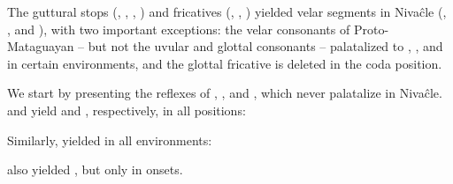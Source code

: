 The guttural stops (, , , ) and fricatives (, , ) yielded velar segments in Nivaĉle (, , and ), with two important exceptions: the velar consonants of Proto-Mataguayan -- but not the uvular and glottal consonants -- palatalized to , , and  in certain environments, and the glottal fricative  is deleted in the coda position.

We start by presenting the reflexes of , , and , which never palatalize in Nivaĉle.  and  yield  and , respectively, in all positions:

\sloppy
\begin{exe}
    \ex \food
    \ex \elbow
    \ex \welln
    \ex \snore
    \ex \inorderto
    \ex \alienable
    \ex \distrust
    \ex \leg
    \ex \dwarf
    \ex \starn
    \ex \costume
    \ex \soul
    \ex \wildcat
    \ex \tsaqaq
    \ex \paralytic
    \ex \wildhoney
    \ex \knee
\end{exe}

Similarly,  yielded  in all environments:

\begin{exe}
    \ex \fatv
    \ex \najendup
    \ex \centipede
    \ex \crab
    \ex \north
    \ex \suncho
    \ex \killbird
    \ex \finger
    \ex \ocelot
    \ex \takeaway
    \ex \redquebracho
    \ex \runv
    \ex \barnowl
    \ex \oldn
    \ex \manysg
    \ex \quick
    \ex \jabiru
    \ex \deep
    \ex \longv
    \ex \siyaj
    \ex \anteater
    \ex \thunder
    \ex \pseudo
    \ex \shoot
    \ex \far
    \ex \burnvi
    \ex \fullriver
    \ex \tsofatajf
    \ex \tired
    \ex \largefat
    \ex \paloflojof
    \ex \piranhamn
    \ex \blackalgarrobof
    \ex \rhea
    \ex \night
    \ex \tuscaf
    \ex \caracara
    \ex \jararaca
    \ex \snakeatuj
    \ex \peccary
    \ex \mistolf
    \ex \hurt
    \ex \argentineboa
    \ex \chaguara
    \ex \wildbean
    \ex \widower
    \ex \mollef
    \ex \meat
    \ex \firei
    \ex \bro
    \ex \puma
\end{exe}

 also yielded , but only in onsets.

\begin{exe}
    \ex \locustmn
    \ex \centipedepl
    \ex \demh
    \ex \acti
    \ex \welln
    \ex \coati
    \ex \cactus
    \ex \pacu
    \ex \oldpl
    \ex \powderpl
    \ex \ropepl
    \ex \wildcat
    \ex \platepl
    \ex \paloflojot
    \ex \headpl
    \ex \caracarapl
    \ex \knee
    \ex \wildbean
    \ex \mollef
    \ex \teach
    \ex \queenpalmf
\end{exe}


